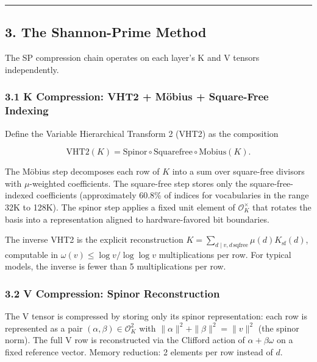 \documentclass[
  11pt,
]{article}
\begin{document}
\begin{center}\rule{0.5\linewidth}{0.5pt}\end{center}

\hypertarget{the-shannon-prime-method}{%
\subsection{3. The Shannon-Prime
Method}\label{the-shannon-prime-method}}

The SP compression chain operates on each layer's K and V tensors
independently.

\hypertarget{k-compression-vht2-muxf6bius-square-free-indexing}{%
\subsubsection{3.1 K Compression: VHT2 + Möbius + Square-Free
Indexing}\label{k-compression-vht2-muxf6bius-square-free-indexing}}

Define the Variable Hierarchical Transform 2 (VHT2) as the composition

\[\mathrm{VHT2}(K) = \mathrm{Spinor} \circ \mathrm{Squarefree} \circ \mathrm{Mobius}(K).\]

The Möbius step decomposes each row of \(K\) into a sum over square-free
divisors with \(\mu\)-weighted coefficients. The square-free step stores
only the square-free-indexed coefficients (approximately 60.8\% of
indices for vocabularies in the range 32K to 128K). The spinor step
applies a fixed unit element of \(\mathcal{O}_K^\times\) that rotates
the basis into a representation aligned to hardware-favored bit
boundaries.

The inverse VHT2 is the explicit reconstruction
\(K = \sum_{d \mid v, d \, \text{sqfree}} \mu(d) K_{\text{sf}}(d)\),
computable in \(\omega(v) \leq \log v / \log\log v\) multiplications per
row. For typical models, the inverse is fewer than 5 multiplications per
row.

\hypertarget{v-compression-spinor-reconstruction}{%
\subsubsection{3.2 V Compression: Spinor
Reconstruction}\label{v-compression-spinor-reconstruction}}

The V tensor is compressed by storing only its spinor representation:
each row is represented as a pair
\((\alpha, \beta) \in \mathcal{O}_K^2\) with
\(\|\alpha\|^2 + \|\beta\|^2 = \|v\|^2\) (the spinor norm). The full V
row is reconstructed via the Clifford action of
\(\alpha + \beta \omega\) on a fixed reference vector. Memory reduction:
2 elements per row instead of \(d\).
\end{document}
